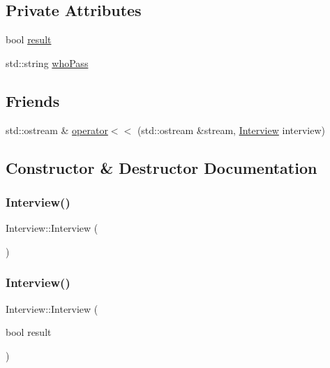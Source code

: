 \subsection*{Private Attributes}
\begin{DoxyCompactItemize}
\item 
bool \hyperlink{class_interview_aa456226f23acfdb23a6c94eab33e3cbb}{result}
\item 
std\+::string \hyperlink{class_interview_a8621e9f225dce314abaf77b7854649f6}{who\+Pass}
\end{DoxyCompactItemize}
\subsection*{Friends}
\begin{DoxyCompactItemize}
\item 
std\+::ostream \& \hyperlink{class_interview_aa32d4e45baf6b6c73433889c6988079f}{operator$<$$<$} (std\+::ostream \&stream, \hyperlink{class_interview}{Interview} interview)
\end{DoxyCompactItemize}


\subsection{Constructor \& Destructor Documentation}
\hypertarget{class_interview_a18c238c7fd5e7a118b0cd41f35f93360}{}\label{class_interview_a18c238c7fd5e7a118b0cd41f35f93360} 
\subsubsection{\texorpdfstring{Interview()}{Interview()}\hspace{0.1cm}{\footnotesize\ttfamily [1/3]}}
{\footnotesize\ttfamily Interview\+::\+Interview (\begin{DoxyParamCaption}{ }\end{DoxyParamCaption})\hspace{0.3cm}{\ttfamily [inline]}}

\hypertarget{class_interview_aedb4e2b612dd1c811957eeba48e7cff2}{}\label{class_interview_aedb4e2b612dd1c811957eeba48e7cff2} 
\subsubsection{\texorpdfstring{Interview()}{Interview()}\hspace{0.1cm}{\footnotesize\ttfamily [2/3]}}
{\footnotesize\ttfamily Interview\+::\+Interview (\begin{DoxyParamCaption}\item[{bool}]{result }\end{DoxyParamCaption})\hspace{0.3cm}{\ttfamily [inline]}}

